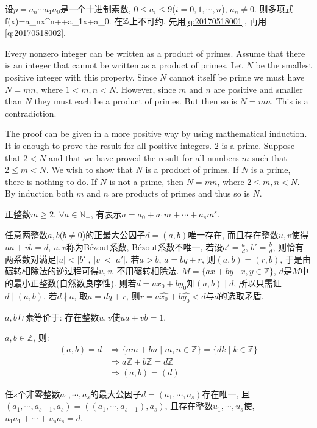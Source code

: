 设$p=\overline{a_n\cdots a_1a_0}$是一个十进制素数, $0\le a_i\le9$($i=0,1,\cdots, n$), $a_n\ne0$. 则多项式
\bee
f(x)=a_nx^n+\cdots+a_1x+a_0.
\eee
在$\Bbb Z$上不可约.
\et
\ba
先用\ref{q:20170518001}, 再用\ref{q:20170518002}.
\ea

\bt{}{}
Every nonzero integer can be written as a product of primes.
\et
\ba
Assume that there is an integer that cannot be written as a product of primes.
Let $N$ be the smallest positive integer with this property. Since $N$ cannot itself be prime we must have
$N=mn$, where $1<m, n<N$. However, since $m$ and $n$ are positive and smaller than $N$ they must each be a product
of primes. But then so is $N=mn$. This is a contradiction.

The proof can be given in a more positive way by using mathematical induction.
It is enough to prove the result for all positive integers. $2$ is a prime.
Suppose that $2<N$ and that we have proved the result for all numbers $m$ such that $2\le m<N$. 
We wish to show that $N$ is a product of primes. 
If $N$ is a prime, there is nothing to do. 
If $N$ is not a prime, then $N=mn$, where $2\le m, n<N$. 
By induction both $m$ and $n$ are products of primes and thus so is $N$.
\ea

正整数$m\ge2$, $\forall a\in\mathbb{N}_{+}$, 有表示$a=a_0+a_1m+\cdots+a_sm^s$.
\et

任意两整数$a,b$($b\ne0$)的正最大公因子$d=(a,b)$唯一存在, 而且存在整数$u,v$使得$ua+vb=d$, 
$u,v$称为B\'{e}zout系数, B\'{e}zout系数不唯一, 若设$a'=\frac{a}{d}$, $b'=\frac{b}{d}$, 则恰有两系数对满足$|u|<|b'|$, $|v|<|a'|$.
\et
\ba
若$a>b$, $a=bq+r$, 则$(a,b)=(r,b)$, 于是由碾转相除法的逆过程可得$u,v$.
\ea
\ba
不用碾转相除法. $M=\{ax+by\mid x,y\in\mathbb{Z}\}$, $d$是$M$中的最小正整数(自然数良序性).
则若$d=ax_0+by_0$知$(a,b)\mid d$, 所以只需证$d\mid(a,b)$.
若$d\nmid a$, 取$a=dq+r$, 则$r=a\hat{x_0}+b\hat{y_0}<d$与$d$的选取矛盾.
\ea

\bc{}{}
$a,b$互素等价于: 存在整数$u,v$使$ua+vb=1$.

$a,b\in\mathbb{Z}$, 则:
\begin{align*}
 (a,b)=d & \Rightarrow \{am+bn\mid m,n\in\mathbb{Z}\}=\{dk\mid k\in\mathbb{Z}\}\\
      & \Rightarrow a\mathbb{Z}+b\mathbb{Z}=d\mathbb{Z}\\
      & \Rightarrow (a,b)=(d)
\end{align*}
\ec

任$s$个非零整数$a_1,\cdots, a_s$的最大公因子$d=(a_1,\cdots,a_s)$存在唯一, 且$(a_1,\cdots,a_{s-1},a_{s})=((a_1,\cdots,a_{s-1}),a_{s})$,
且存在整数$u_1,\cdots,u_s$使, $u_1a_1+\cdots+u_sa_s=d$.
\ec

